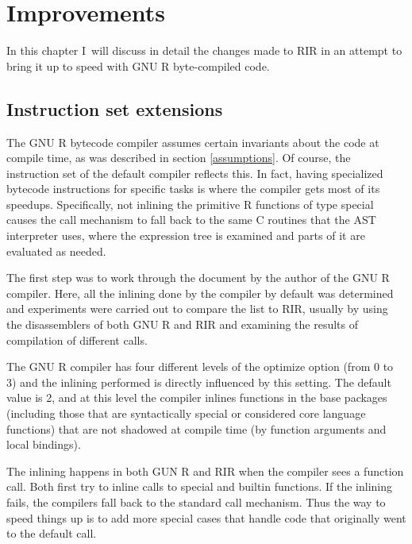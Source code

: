 \chapter{Improvements\label{improvements}}

In this chapter I~will discuss in detail the changes made to RIR in an attempt to bring it up to speed with GNU R byte-compiled code.


\section{Instruction set extensions}

The GNU R bytecode compiler assumes certain invariants about the code at compile time, as was described in section \ref{assumptions}. Of course, the instruction set of the default compiler reflects this. In fact, having specialized bytecode instructions for specific tasks is where the compiler gets most of its speedups. Specifically, not inlining the primitive R functions of type \todo[verb]special causes the call mechanism to fall back to the same C routines that the AST interpreter uses, where the expression tree is examined and parts of it are evaluated as needed.

The first step was to work through the document \autocite{compiler} by the author of the GNU R compiler. Here, all the inlining done by the compiler by default was determined and experiments were carried out to compare the list to RIR, usually by using the disassemblers of both GNU R and RIR and examining the results of compilation of different calls.

The GNU R compiler has four different levels of the \todo[verb]optimize option (from 0 to 3) and the inlining performed is directly influenced by this setting. The default value is 2, and at this level the compiler inlines functions in the base packages (including those that are syntactically special or considered core language functions) that are not shadowed at compile time (by function arguments and local bindings).

The inlining happens in both GUN R and RIR when the compiler sees a function call. Both first try to inline calls to special and builtin functions. If the inlining fails, the compilers fall back to the standard call mechanism. Thus the way to speed things up is to add more special cases that handle code that originally went to the default call.

